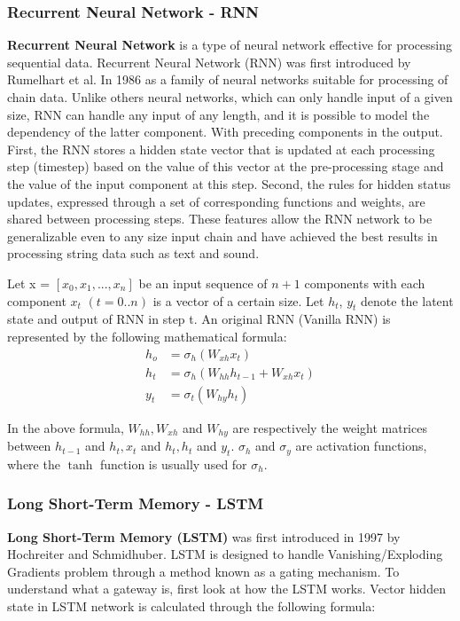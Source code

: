 \subsubsection{Recurrent Neural Network - RNN}
\textbf{Recurrent Neural Network} is a type of neural network effective for processing sequential data. Recurrent Neural Network (RNN) was first introduced by Rumelhart et al. In 1986 as a family of neural networks suitable for processing of chain data. Unlike others neural networks, which can only handle input of a given size, RNN can handle any input of any length, and it is possible to model the dependency of the latter component. With preceding components in the output. First, the RNN stores a hidden state vector that is updated at each processing step (timestep) based on the value of this vector at the pre-processing stage and the value of the input component at this step. Second, the rules for hidden status updates, expressed through a set of corresponding functions and weights, are shared between processing steps. These features allow the RNN network to be generalizable even to any size input chain and have achieved the best results in processing string data such as text and sound.

Let x = $[x_{0}, x_{1}, ..., x_{n}]$ be an input sequence of $n + 1$ components with each component $x_{t}$ $(t = 0..n)$ is a vector of a certain size. Let $h_{t}$, $y_{t}$ denote the latent state and output of RNN in step t. An original RNN (Vanilla RNN) is represented by the following mathematical formula:
\begin{align}
h_{o} &= \sigma_{h}(W_{xh}x_{t})\\
h_{t} &= \sigma_{h}(W_{hh}h_{t-1} + W_{xh}x_{t})\\
y_{t} &= \sigma_{t}(W_{hy}h_{t})
\end{align}

In the above formula, $W_{hh}, W_{xh}$ and $W_{hy}$ are respectively the weight matrices between $h_{t-1}$ and $h_{t}, x_{t}$ and $h_{t}, h_{t}$ and $y_{t}$. $\sigma_{h}$ and $\sigma_{y}$ are activation functions, where the $\tanh$ function is usually used for $\sigma_{h}$.
\subsubsection{Long Short-Term Memory - LSTM}
\textbf{Long Short-Term Memory (LSTM)} was first introduced in 1997 by Hochreiter and Schmidhuber. LSTM is designed to handle Vanishing/Exploding Gradients problem through a method known as a gating mechanism. To understand what a gateway is, first look at how the LSTM works. Vector hidden state in LSTM network is calculated through the following formula:


